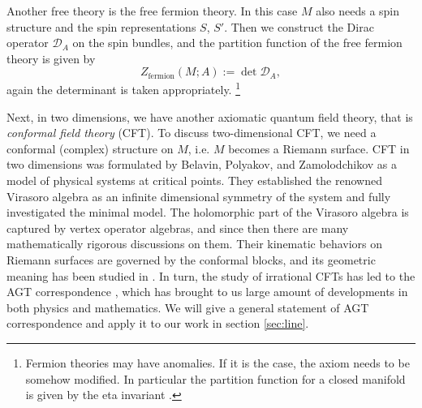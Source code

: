 Another free theory is the free fermion theory. In this case $M$
also needs a spin structure and the spin representations $S$, $S'$.
Then we construct the Dirac operator $\mathcal{D}_{A}$ on the spin
bundles, and the partition function of the free fermion theory is given
by
\begin{equation}
Z_{\mathrm{fermion}}(M;A):=\det\mathcal{D}_{A},
\end{equation}
again the determinant is taken appropriately.%
%
\footnote{Fermion theories may have anomalies. If it is the case, the axiom
needs to be somehow modified. In particular the partition function
for a closed manifold is given by the eta invariant \cite{Dai:1994kq}.}

Next, in two dimensions, we have another axiomatic quantum field theory,
that is \emph{conformal field theory} (CFT).
To discuss two-dimensional CFT, we need a conformal (complex) structure
on $M$, i.e. $M$ becomes a Riemann surface. CFT in two dimensions was formulated by Belavin, Polyakov,
and Zamolodchikov \cite{Belavin:1984vu} as a model of physical systems at critical
points. They established the renowned Virasoro algebra as an infinite
dimensional symmetry of the system and fully investigated the minimal
model. The holomorphic part of the Virasoro algebra is captured by
vertex operator algebras, and since then there are many mathematically
rigorous discussions on them. Their kinematic behaviors on Riemann
surfaces are governed by the conformal blocks, and its geometric meaning
has been studied in \cite{Friedan:1986ua}. In turn, the study of irrational
CFTs has led to the AGT correspondence \cite{Alday:2009aq}, which has brought
to us large amount of developments in both physics and mathematics.
We will give a general statement of AGT correspondence and apply it to our work
in section \ref{sec:line}.

